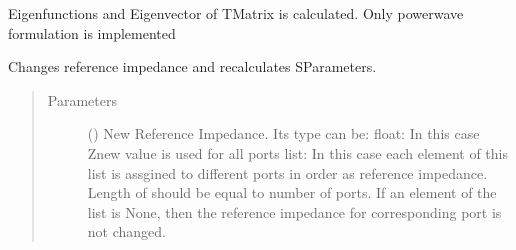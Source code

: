 \documentclass[letterpaper,10pt,english]{sphinxmanual}
\begin{document}
\begin{fulllineitems}
\begin{fulllineitems}
\begin{quote}
\begin{description}
\end{description}\end{quote}

\end{fulllineitems}


\begin{fulllineitems}
\label{\detokenize{touchstone:touchstone.spfile.calc_t_eigs}}
Eigenfunctions and Eigenvector of T\sphinxhyphen{}Matrix is calculated.
Only power\sphinxhyphen{}wave formulation is implemented

\end{fulllineitems}


\begin{fulllineitems}
\label{\detokenize{touchstone:touchstone.spfile.change_formulation}}
\end{fulllineitems}


\begin{fulllineitems}
\label{\detokenize{touchstone:touchstone.spfile.change_ref_impedance}}
Changes reference impedance and re\sphinxhyphen{}calculates S\sphinxhyphen{}Parameters.
\begin{quote}\begin{description}
\item[{Parameters}] \leavevmode
{} () \textendash{} New Reference Impedance. Its type can be:
\sphinxhyphen{} float: In this case Znew value is used for all ports
\sphinxhyphen{} list: In this case each element of this list is assgined to different ports in order as reference impedance. Length of  should be equal to number of ports. If an element of the list is None, then the reference impedance for corresponding port is not changed.


\end{description}
\end{quote}
\end{fulllineitems}
\end{fulllineitems}
\end{document}
